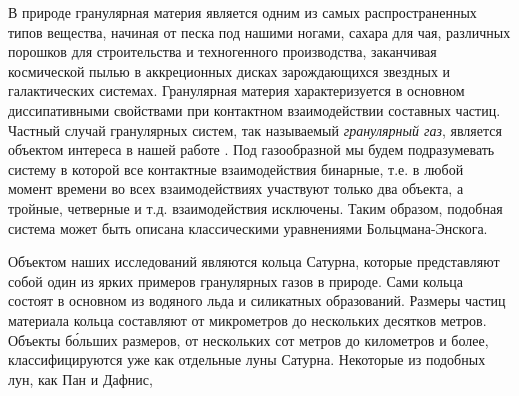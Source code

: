 \Introduction

В природе гранулярная материя является одним из самых распространенных типов вещества, начиная от песка под нашими ногами,
сахара для чая, различных порошков для строительства и техногенного производства, заканчивая космической пылью в аккреционных дисках 
зарождающихся звездных и галактических системах. Гранулярная материя характеризуется в основном диссипативными свойствами при контактном
взаимодействии составных частиц. Частный случай гранулярных систем, так называемый \emph{гранулярный газ}, является объектом интереса
в нашей работе \cite{Brilliantov:2004book}. Под газообразной мы будем подразумевать систему в которой все контактные взаимодействия бинарные, 
т.е. в любой момент времени во всех взаимодействиях участвуют только два объекта, а тройные, четверные и т.д. взаимодействия исключены.
Таким образом, подобная система может быть описана классическими уравнениями Больцмана-Энскога.

Объектом наших исследований являются кольца Сатурна, которые представляют собой один из ярких примеров гранулярных газов в природе. 
Сами кольца состоят в основном из водяного льда и силикатных образований. Размеры частиц материала кольца составляют от микрометров до нескольких 
десятков метров. Объекты б\'{о}льших размеров, от нескольких сот метров до километров и более, классифицируются уже как отдельные луны Сатурна. 
Некоторые из подобных лун, как Пан и Дафнис, 
